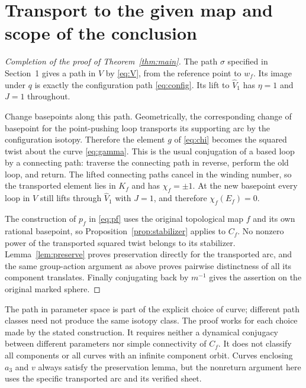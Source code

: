 \documentclass[11pt]{article}
\theoremstyle{remark}
\begin{document}
\section{Transport to the given map and scope of the conclusion}
\begin{proof}[Completion of the proof of Theorem~\ref{thm:main}]
The path $\sigma$ specified in Section~1 gives a path in $V$ by \eqref{eq:V}, from the reference point to $w_f$. Its image under $q$ is exactly the configuration path \eqref{eq:config}. Its lift to $\widehat V_1$ has $\eta=1$ and $J=1$ throughout.

Change basepoints along this path. Geometrically, the corresponding change of basepoint for the point-pushing loop transports its supporting arc by the configuration isotopy. Therefore the element $g$ of \eqref{eq:chi} becomes the squared twist about the curve \eqref{eq:gamma}. This is the usual conjugation of a based loop by a connecting path: traverse the connecting path in reverse, perform the old loop, and return. The lifted connecting paths cancel in the winding number, so the transported element lies in $K_f$ and has $\chi_f=\pm1$. At the new basepoint every loop in $V$ still lifts through $\widehat V_1$ with $J=1$, and therefore $\chi_f(E_f)=0$.

The construction of $p_f$ in \eqref{eq:pf} uses the original topological map $f$ and its own rational basepoint, so Proposition~\ref{prop:stabilizer} applies to $C_f$. No nonzero power of the transported squared twist belongs to its stabilizer. Lemma~\ref{lem:preserve} proves preservation directly for the transported arc, and the same group-action argument as above proves pairwise distinctness of all its component translates. Finally conjugating back by $m^{-1}$ gives the assertion on the original marked sphere.
\end{proof}

The path in parameter space is part of the explicit choice of curve; different path classes need not produce the same isotopy class. The proof works for each choice made by the stated construction. It requires neither a dynamical conjugacy between different parameters nor simple connectivity of $C_f$. It does not classify all components or all curves with an infinite component orbit. Curves enclosing $a_3$ and $v$ always satisfy the preservation lemma, but the nonreturn argument here uses the specific transported arc and its verified sheet.
\end{document}
